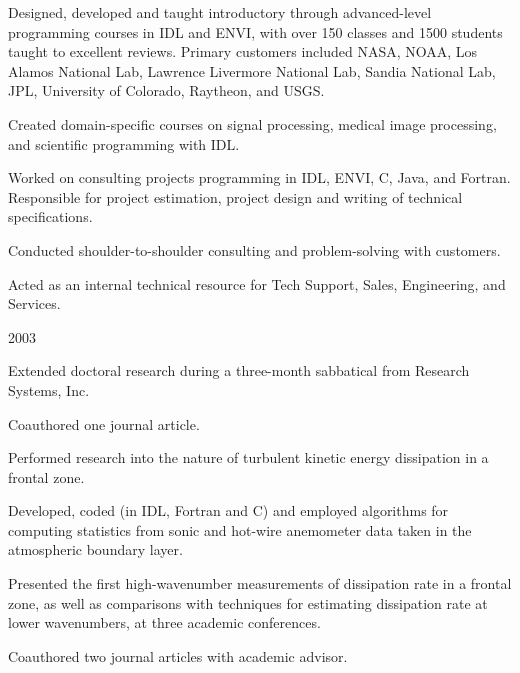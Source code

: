 \documentclass[letterpaper]{resume}
\begin{document}
\begin{compactitem}[\itembullet]
  \item Designed, developed and taught introductory through
    advanced-level programming courses in IDL and ENVI, with over 150
    classes and 1500 students taught to excellent reviews. Primary
    customers included NASA, NOAA, Los Alamos National Lab, Lawrence
    Livermore National Lab, Sandia National Lab, JPL, University of
    Colorado, Raytheon, and USGS.
  \item Created domain-specific courses on signal processing, medical
    image processing, and scientific programming with IDL.
  \item Worked on consulting projects programming in IDL, ENVI, C,
    Java, and Fortran. Responsible for project estimation, project
    design and writing of technical specifications.
  \item Conducted shoulder-to-shoulder consulting and problem-solving
    with customers.
  \item Acted as an internal technical resource for Tech Support,
    Sales, Engineering, and Services.
\end{compactitem}

 {2003}
\begin{compactitem}[\itembullet]
  \item Extended doctoral research during a three-month sabbatical
    from Research Systems, Inc.
  \item Coauthored one journal article.
\end{compactitem}

\begin{compactitem}[\itembullet]
  \item Performed research into the nature of turbulent kinetic energy
    dissipation in a frontal zone.
  \item Developed, coded (in IDL, Fortran and C) and employed
    algorithms for computing statistics from sonic and hot-wire
    anemometer data taken in the atmospheric boundary layer.
  \item Presented the first high-wavenumber measurements of
    dissipation rate in a frontal zone, as well as comparisons with
    techniques for estimating dissipation rate at lower wavenumbers,
    at three academic conferences.
  \item Coauthored two journal articles with academic advisor.
\end{compactitem}
\end{document}

